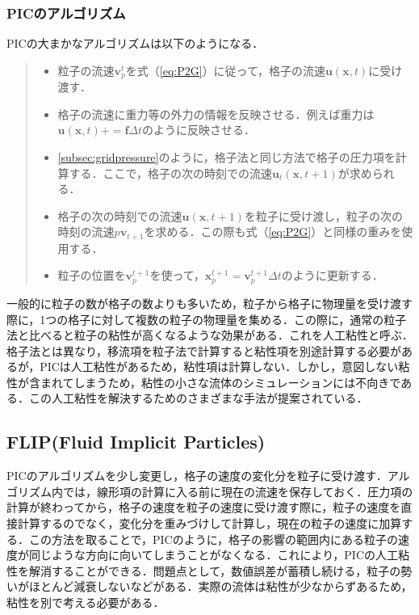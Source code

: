 \documentclass[a4j,12pt]{jreport}
\begin{document}
\subsubsection{PICのアルゴリズム} \label{subsec:PIC_algo}
PICの大まかなアルゴリズムは以下のようになる．
\begin{quote}
	\begin{itemize}
		\item 粒子の流速$\bm{v}^{t}_p$を式（\ref{eq:P2G}）に従って，格子の流速$\bm{u}(\bm{x},t)$に受け渡す．
		\item 格子の流速に重力等の外力の情報を反映させる．例えば重力は$\bm{u}(\bm{x},t) += \bm{f}\Delta t$のように反映させる．
		\item \ref{subsec:gridpressure}のように，格子法と同じ方法で格子の圧力項を計算する．ここで，格子の次の時刻での流速$\bm{u}_t(\bm{x},t+1)$が求められる．
		\item 格子の次の時刻での流速$\bm{u}(\bm{x},t+1)$を粒子に受け渡し，粒子の次の時刻の流速$p\bm{v}_{t+1}$を求める．この際も式（\ref{eq:P2G}）と同様の重みを使用する．
		\item 粒子の位置を$\bm{v}^{t+1}_p$を使って，$\bm{x}^{t+1}_p = \bm{v}^{t+1}_p\Delta t $のように更新する．
	\end{itemize}
\end{quote}

一般的に粒子の数が格子の数よりも多いため，粒子から格子に物理量を受け渡す際に，1つの格子に対して複数の粒子の物理量を集める．この際に，通常の粒子法と比べると粒子の粘性が高くなるような効果がある．これを人工粘性と呼ぶ．格子法とは異なり，移流項を粒子法で計算すると粘性項を別途計算する必要があるが，PICは人工粘性があるため，粘性項は計算しない．しかし，意図しない粘性が含まれてしまうため，粘性の小さな流体のシミュレーションには不向きである．この人工粘性を解決するためのさまざまな手法が提案されている．
\subsection{FLIP(Fluid Implicit Particles)} \label{subsec:FLIP}
PICのアルゴリズムを少し変更し，格子の速度の変化分を粒子に受け渡す．アルゴリズム内では，線形項の計算に入る前に現在の流速を保存しておく．圧力項の計算が終わってから，格子の速度を粒子の速度に受け渡す際に，粒子の速度を直接計算するのでなく，変化分を重みづけして計算し，現在の粒子の速度に加算する．この方法を取ることで，PICのように，格子の影響の範囲内にある粒子の速度が同じような方向に向いてしまうことがなくなる．これにより，PICの人工粘性を解消することができる．問題点として，数値誤差が蓄積し続ける，粒子の勢いがほとんど減衰しないなどがある．実際の流体は粘性が少なからずあるため，粘性を別で考える必要がある．
\end{document}
